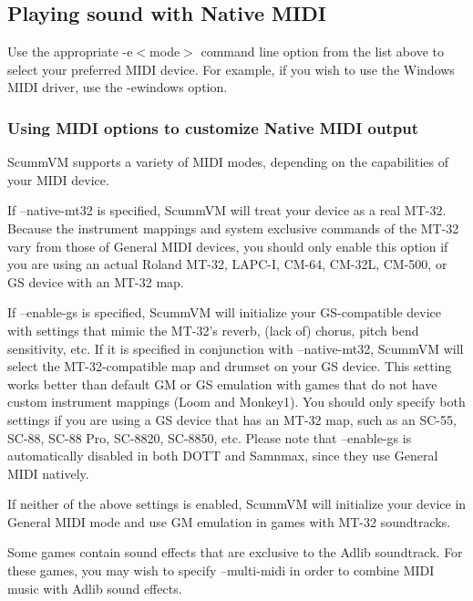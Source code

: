 \subsection{Playing sound with Native MIDI}

Use the appropriate -e$<$mode$>$ command line option from the list above to
select your preferred MIDI device. For example, if you wish to use the
Windows MIDI driver, use the -ewindows option.


\subsubsection{Using MIDI options to customize Native MIDI output}

ScummVM supports a variety of MIDI modes, depending on the capabilities
of your MIDI device.

If --native-mt32 is specified, ScummVM will treat your device as a real
MT-32. Because the instrument mappings and system exclusive commands of
the MT-32 vary from those of General MIDI devices, you should only
enable this option if you are using an actual Roland MT-32, LAPC-I, CM-64,
CM-32L, CM-500, or GS device with an MT-32 map.

If --enable-gs is specified, ScummVM will initialize your GS-compatible
device with settings that mimic the MT-32's reverb, (lack of) chorus,
pitch bend sensitivity, etc. If it is specified in conjunction with
--native-mt32, ScummVM will select the MT-32-compatible map and drumset on
your GS device. This setting works better than default GM or GS emulation
with games that do not have custom instrument mappings (Loom and Monkey1).
You should only specify both settings if you are using a GS device that
has an MT-32 map, such as an SC-55, SC-88, SC-88 Pro, SC-8820, SC-8850, etc.
Please note that --enable-gs is automatically disabled in both DOTT and
Samnmax, since they use General MIDI natively.

If neither of the above settings is enabled, ScummVM will initialize your
device in General MIDI mode and use GM emulation in games with MT-32
soundtracks.

Some games contain sound effects that are exclusive to the Adlib soundtrack.
For these games, you may wish to specify --multi-midi in order to combine
MIDI music with Adlib sound effects.


